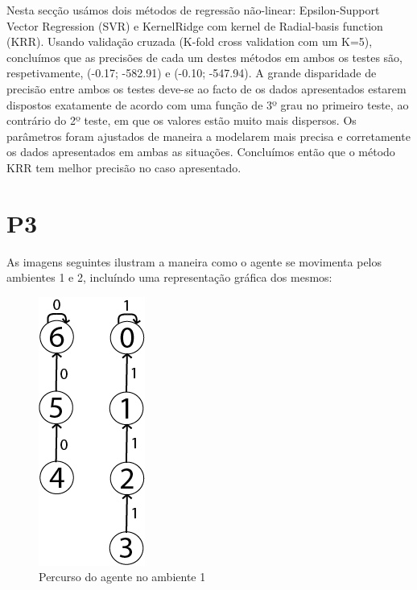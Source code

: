 \documentclass[11pt,twocolumn]{article}
\begin{document}
Nesta secção usámos dois métodos de regressão não-linear: Epsilon-Support Vector Regression (SVR) e KernelRidge com kernel de Radial-basis function (KRR).
Usando validação cruzada (K-fold cross validation com um K=5), concluímos que as precisões de cada um destes métodos em ambos os testes são, respetivamente, (-0.17; -582.91) e (-0.10; -547.94).
A grande disparidade de precisão entre ambos os testes deve-se ao facto de os dados apresentados estarem dispostos exatamente de acordo com uma função de 3º grau no primeiro teste,
ao contrário do 2º teste, em que os valores estão muito mais dispersos.
Os parâmetros foram ajustados de maneira a modelarem mais precisa e corretamente os dados apresentados em ambas as situações.
Concluímos então que o método KRR tem melhor precisão no caso apresentado.

\section*{P3}

As imagens seguintes ilustram a maneira como o agente se movimenta pelos ambientes 1 e 2, incluíndo uma representação gráfica dos mesmos:
	
\begin{figure}[htbp]
    \begin{center}
        \includegraphics[scale=0.4]{Trajetoria1.png}
        \caption[justification=centering]{Percurso do agente no ambiente 1}
    \end{center}
    \end{figure}
    
\end{document}
